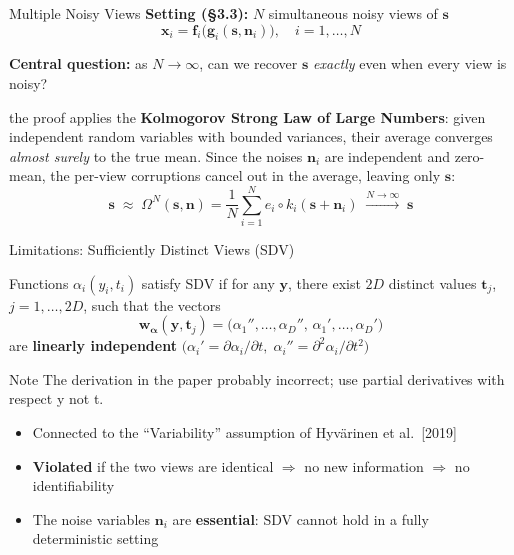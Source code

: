\documentclass[aspectratio=169, 10pt]{beamer}
\begin{document}
\begin{frame}{Multiple Noisy Views}
  \textbf{Setting (§3.3):} $N$ simultaneous noisy views of $\mathbf{s}$
  \[
    \mathbf{x}_i = \mathbf{f}_i\!\bigl(\mathbf{g}_i(\mathbf{s},\mathbf{n}_i)\bigr),
    \quad i=1,\ldots,N
  \]

  \medskip
  \textbf{Central question:} as $N\to\infty$, can we recover $\mathbf{s}$ \emph{exactly}
  even when every view is noisy?

  \bigskip
  \begin{theorem}
    the proof applies the \textbf{Kolmogorov Strong Law of Large Numbers}:
  given independent random variables with bounded variances, their average converges
  \emph{almost surely} to the true mean.
  Since the noises $\mathbf{n}_i$ are independent and zero-mean, the per-view corruptions
  cancel out in the average, leaving only $\mathbf{s}$:
  \[
    \mathbf{s}
    \;\approx\;
    \Omega^N(\mathbf{s},\mathbf{n})
    = \frac{1}{N}\sum_{i=1}^N e_i\circ k_i(\mathbf{s}+\mathbf{n}_i)
    \;\xrightarrow{N\to\infty}\;\mathbf{s}
  \]
  \end{theorem}

\end{frame}

\begin{frame}{Limitations: Sufficiently Distinct Views (SDV)}
  \begin{definition}
    Functions $\alpha_i(y_i,t_i)$ satisfy SDV if for any $\mathbf{y}$,
    there exist $2D$ distinct values $\mathbf{t}_j$, $j=1,\ldots,2D$, such that the vectors
    \[
      \mathbf{w}_{\boldsymbol{\alpha}}(\mathbf{y},\mathbf{t}_j)
      =\bigl(\alpha_1'',\ldots,\alpha_D'',\,\alpha_1',\ldots,\alpha_D'\bigr)
    \]
    are \textbf{linearly independent}
    \hfill
    $\bigl(\alpha_i'=\partial\alpha_i/\partial t,\;\alpha_i''=\partial^2\alpha_i/\partial t^2\bigr)$
  \end{definition}

  \begin{alertblock}{Note}
    The derivation in the paper probably incorrect; use partial derivatives with respect y not t.
  \end{alertblock}

  \medskip
  \begin{itemize}
    \item Connected to the ``Variability'' assumption of Hyvärinen et al.\ [2019]
    \item \textbf{Violated} if the two views are identical $\Rightarrow$ no new information
          $\Rightarrow$ no identifiability
    \item The noise variables $\mathbf{n}_i$ are \textbf{essential}: SDV cannot hold in a
          fully deterministic setting
  \end{itemize}

\end{frame}
\end{document}
